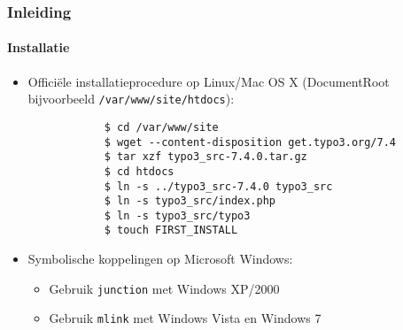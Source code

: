 \begin{frame}[fragile]
	\frametitle{Inleiding}
	\framesubtitle{Installatie}

	\begin{itemize}
		\item Officiële installatieprocedure op Linux/Mac OS X\newline
			(DocumentRoot bijvoorbeeld \texttt{/var/www/site/htdocs}):
		\begin{lstlisting}
			$ cd /var/www/site
			$ wget --content-disposition get.typo3.org/7.4
			$ tar xzf typo3_src-7.4.0.tar.gz
			$ cd htdocs
			$ ln -s ../typo3_src-7.4.0 typo3_src
			$ ln -s typo3_src/index.php
			$ ln -s typo3_src/typo3
			$ touch FIRST_INSTALL
		\end{lstlisting}

		\item Symbolische koppelingen op Microsoft Windows:

			\begin{itemize}
				\item Gebruik \texttt{junction} met Windows XP/2000
				\item Gebruik \texttt{mlink} met Windows Vista en Windows 7
			\end{itemize}

	\end{itemize}
\end{frame}


